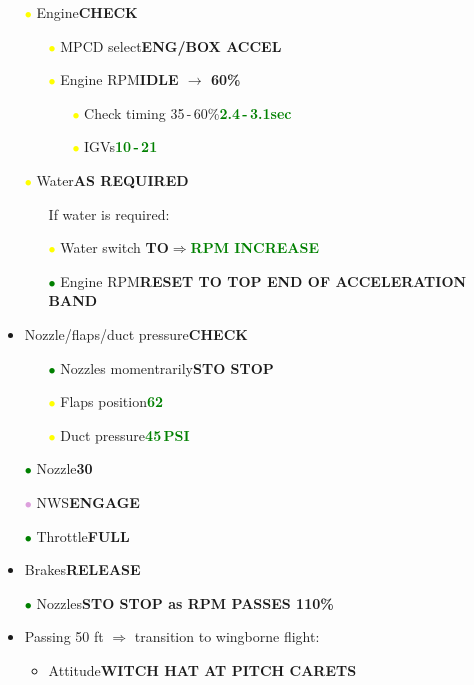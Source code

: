 \documentclass[a4paper,12pt,dvipsnames]{letter}
\newcommand{\button}[1]{\textbf{#1}}
\newcommand{\Deg}{\textdegree{}}
\newcommand{\ok}[1]{\textcolor{Green}{\textbf{#1}}}
\newcommand{\gi}{\textcolor{Green}{$\bullet$\;}}
\newcommand{\yi}{\textcolor{Yellow}{$\bullet$\;}}
\newcommand{\vi}{\textcolor{Plum}{$\bullet$\;}}
\begin{document}
{\begin{itemize}
\item[\yi] Engine\dotfill\button{CHECK}
\begin{itemize}
 \item[\yi] MPCD select\dotfill\button{ENG/BOX ACCEL}
 \item[\yi] Engine RPM\dotfill\button{IDLE $\rightarrow$ 60\%}
 \begin{itemize}
  \item[\yi] Check timing 35\,-\,60\%\dotfill\ok{2.4\,-\,3.1\;sec}
  \item[\yi] IGVs\dotfill\ok{10\Deg\,-\,21\Deg}	
 \end{itemize}
\end{itemize}
\item[\yi] Water\dotfill\button{AS REQUIRED}
\begin{itemize}
 \item[] If water is required:
 \item[\yi] Water switch \dotfill\button{TO}\;$\Rightarrow$\;\ok{RPM INCREASE}
 \item[\gi] Engine RPM\dotfill\button{RESET TO TOP END OF ACCELERATION BAND}
\end{itemize}
\item Nozzle/flaps/duct pressure\dotfill\button{CHECK}
\begin{itemize}
 \item[\gi] Nozzles momentrarily\dotfill\button{STO STOP}
 \item[\yi] Flaps position\dotfill\ok{62\Deg}
 \item[\yi] Duct pressure\dotfill\ok{45\,PSI}
\end{itemize}
\item[\gi] Nozzle\dotfill\button{30\Deg}
\item[\vi] NWS\dotfill\button{ENGAGE}
\item[\gi] Throttle\dotfill\button{FULL}
\item Brakes\dotfill\button{RELEASE}
\item[\gi] Nozzles\dotfill\button{STO STOP as RPM PASSES 110\%}
\item Passing 50 ft $\Rightarrow$ transition to wingborne flight:
\begin{itemize}
\item Attitude\dotfill\button{WITCH HAT AT PITCH CARETS}

\end{itemize}
\end{itemize}}
\end{document}

